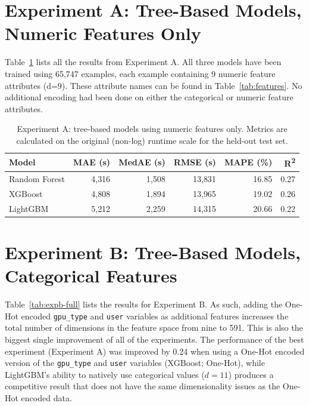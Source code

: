 \clearpage
\section{Experiment A: Tree-Based Models, Numeric Features Only}

Table~\ref{tab:expa-full} lists all the results from Experiment A. All three models have been trained using 65,747 examples, each example containing 9 numeric feature attributes (d=9). These attribute names can be found in Table~\ref{tab:features}. No additional encoding had been done on either the categorical or numeric feature attributes.

\begin{table}[H]
\centering
\caption[Results for Experiment A]{Experiment A: tree-based models using numeric features only. Metrics are calculated on the original (non-log) runtime scale for the held-out test set.}
\label{tab:expa-full}
\begin{tabular}{lrrrrr}
\hline
\textbf{Model} & \textbf{MAE (s)} & \textbf{MedAE (s)} & \textbf{RMSE (s)} & \textbf{MAPE (\%)} & \textbf{R\textsuperscript{2}} \\ 
\hline
Random Forest  & 4{,}316 & 1{,}508 & 13{,}831 & 16.85 & 0.27 \\ 
XGBoost        & 4{,}808 & 1{,}894 & 13{,}965 & 19.02 & 0.26 \\ 
LightGBM       & 5{,}212 & 2{,}259 & 14{,}315 & 20.66 & 0.22 \\ 
\hline
\end{tabular}
\end{table}

\clearpage
\section{Experiment B: Tree-Based Models, Categorical Features}

Table~\ref{tab:expb-full} lists the results for Experiment B. As such, adding the One-Hot encoded \texttt{gpu\_type} and \texttt{user} variables as additional features increases the total number of dimensions in the feature space from nine to 591. This is also the biggest single improvement of all of the experiments. The performance of the best experiment (Experiment A) was improved by 0.24 when using a One-Hot encoded version of the \texttt{gpu\_type} and \texttt{user} variables (XGBoost; One-Hot), while LightGBM's ability to natively use categorical values ($d=11$) produces a competitive result that does not have the same dimensionality issues as the One-Hot encoded data.

